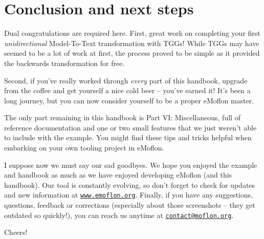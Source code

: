 \newpage
\section{Conclusion and next steps}
\genHeader

Dual congratulations are required here. First, great work on completing your first \emph{unidirectional} Model-To-Text transformation with TGGs! While TGGs
may have seemed to be a lot of work at first, the process proved to be simple as it provided the backwards transformation for free.

Second, if you've really worked through \emph{every} part of this handbook, upgrade from the coffee and get yourself a nice cold beer -- you've earned it! It's
been a long journey, but you can now consider yourself to be a proper eMoflon master.

The only part remaining in this handbook is Part VI: Miscellaneous, full of reference documentation and one or two small features that we just weren't able to
include with the example. You might find these tips and tricks helpful when embarking on your own tooling project in eMoflon.

I suppose now we must say our sad goodbyes. We hope you enjoyed the example and handbook as much as we have enjoyed developing eMoflon (and this handbook). Our
tool is constantly evolving, so don't forget to check for updates and new information at \texttt{\url{www.emoflon.org}}. Finally, if you have any suggestions,
questions, feedback or corrections (especially about those screenshots -- they get outdated so quickly!), you can reach us anytime at
\texttt{\href{mailto:contact@moflon.org}{contact@moflon.org}}.

Cheers!
